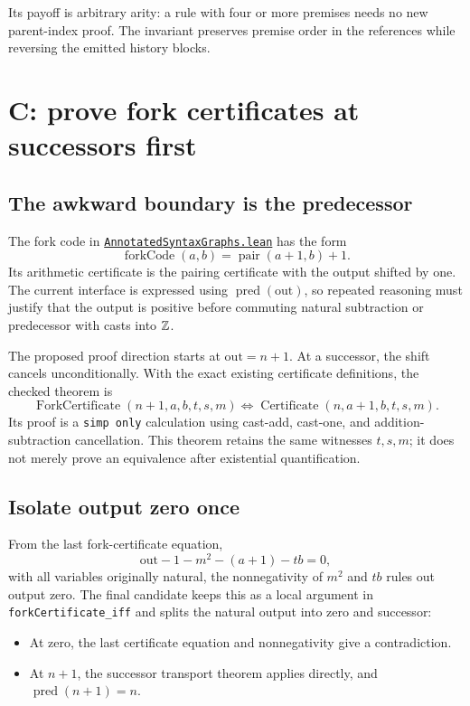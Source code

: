 \documentclass[11pt]{article}
\theoremstyle{remark}\newtheorem{remark}[proposition]{Remark}
\newcommand{\code}[1]{\nolinkurl{#1}}
\newcommand{\sref}[2]{\href{https://github.com/VladimirReshetnikov/ProveIt/blob/7fa06d530df54d4aeb2e18027409df082234c69e/#1}{#2}}
\newcommand{\source}[1]{\sref{Computability/DiophantineConsistency/Lean/DiophantineConsistency/#1.lean}{\code{#1.lean}}}
\begin{document}
\FragmentStatus

Its payoff is arbitrary arity: a rule with four or more premises needs no new parent-index proof. The invariant preserves premise order in the references while reversing the emitted history blocks.

\section{C: prove fork certificates at successors first}\label{sec:fork}

\subsection{The awkward boundary is the predecessor}

The fork code in \source{AnnotatedSyntaxGraphs} has the form
\[
 \operatorname{forkCode}(a,b)=\operatorname{pair}(a+1,b)+1.
\]
Its arithmetic certificate is the pairing certificate with the output shifted by one. The current interface is expressed using \(\operatorname{pred}(\mathrm{out})\), so repeated reasoning must justify that the output is positive before commuting natural subtraction or predecessor with casts into \(\mathbb{Z}\).

The proposed proof direction starts at \(\mathrm{out}=n+1\). At a successor, the shift cancels unconditionally. With the exact existing certificate definitions, the checked theorem is
\[
 \operatorname{ForkCertificate}(n+1,a,b,t,s,m)
 \iff \operatorname{Certificate}(n,a+1,b,t,s,m).
\]
Its proof is a \code{simp only} calculation using cast-add, cast-one, and addition-subtraction cancellation. This theorem retains the same witnesses \(t,s,m\); it does not merely prove an equivalence after existential quantification.

\subsection{Isolate output zero once}

From the last fork-certificate equation,
\[
 \mathrm{out}-1-m^2-(a+1)-tb=0,
\]
with all variables originally natural, the nonnegativity of \(m^2\) and \(tb\) rules out output zero. The final candidate keeps this as a local argument in \code{forkCertificate_iff} and splits the natural output into zero and successor:

\begin{itemize}
\item At zero, the last certificate equation and nonnegativity give a contradiction.
\item At \(n+1\), the successor transport theorem applies directly, and \(\operatorname{pred}(n+1)=n\).
\end{itemize}
\end{document}
